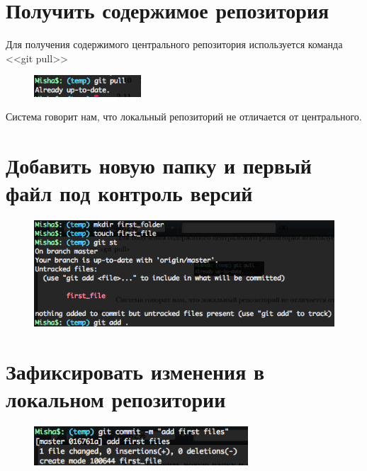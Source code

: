 \documentclass[utf8x, 12pt]{G7-32}
\begin{document}
\section{Получить содержимое репозитория}

Для получения содержимого центрального репозитория используется команда <<git pull>> 

\begin{figure}[hhh!]
	\begin{center}
		\includegraphics[width=4cm]{img/2}
	\end{center}
\end{figure}	

Система говорит нам, что локальный репозиторий не отличается от центрального.

\newpage

\section{Добавить новую папку и первый файл под контроль версий}

\begin{figure}[hhh!]
	\begin{center}
		\includegraphics[width=12cm]{img/3}
	\end{center}
\end{figure}	


\section{Зафиксировать изменения в локальном репозитории}

\begin{figure}[hhh!]
	\begin{center}
		\includegraphics[width=8cm]{img/4}
	\end{center}
\end{figure}
\end{document}
